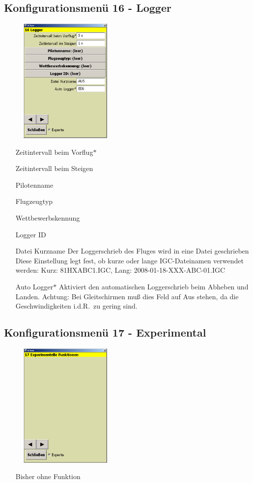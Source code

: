 \subsection{Konfigurationsmenü 16 - Logger}\label{Konfig16}
\begin{figure}
\includegraphics[width=4.5cm]{Bilder/Konfig16Logger.png}
\end{figure}
\begin{enumerate}
\item[Zeitintervall beim Vorflug$\ast$]
\item[Zeitintervall beim Steigen]
\item[Pilotenname]
\item[Flugzeugtyp]
\item[Wettbewerbskennung]
\item[Logger ID]
\item[Datei Kurzname] Der Loggerschrieb des Fluges wird in eine Datei geschrieben
Diese Einstellung legt fest, ob kurze oder lange IGC-Dateinamen verwendet werden:
Kurz: 81HXABC1.IGC,  Lang: 2008-01-18-XXX-ABC-01.IGC
\item[Auto Logger$\ast$] Aktiviert den automatischen Loggerschrieb beim Abheben und Landen. Achtung: Bei Gleitschirmen muß dies Feld auf Aus stehen, da die Geschwindigkeiten i.d.R.\ zu gering sind.
\end{enumerate}

\subsection{Konfigurationsmenü 17 - Experimental}\label{Konfig17}
\begin{figure}
\includegraphics[width=4.5cm]{Bilder/Konfig17Experimental.png}
\end{figure}
\begin{enumerate}
\item[Bisher ohne Funktion]
\end{enumerate} 